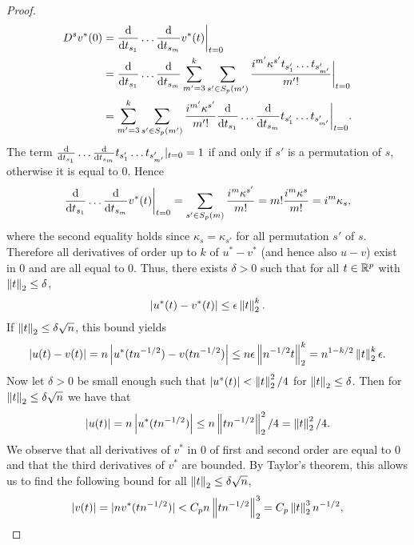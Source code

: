 \begin{proof}
    \begin{align*}
        D^s v^*(0)
        &= \frac{\text{d}}{\text{d} t_{s_1}}\ldots\frac{\text{d}}{\text{d} t_{s_m}} v^*(t) \bigg|_{t=0}\\
        &= \frac{\text{d}}{\text{d} t_{s_1}}\ldots\frac{\text{d}}{\text{d} t_{s_m}} \sum_{m'=3}^k \sum_{s' \in S_p(m')} \frac{i^{m'}\kappa^{s'}t_{s'_1}\ldots t_{s'_{m'}}}{m'!} \bigg|_{t=0} \\
        &= \sum_{m'=3}^k \sum_{s' \in S_p(m')} \frac{i^{m'}\kappa^{s'}}{m'!} \frac{\text{d}}{\text{d} t_{s_1}}\ldots\frac{\text{d}}{\text{d} t_{s_m}}t_{s'_1}\ldots t_{s'_{m'}} \bigg|_{t=0}.
    \end{align*}
    The term $\frac{\text{d}}{\text{d} t_{s_1}}\ldots\frac{\text{d}}{\text{d} t_{s_m}}t_{s'_1}\ldots t_{s'_{m'}} |_{t=0} = 1$ if and only if $s'$ is a permutation of $s$, otherwise it is equal to 0. Hence
    \begin{equation*}
        \frac{\text{d}}{\text{d} t_{s_1}}\ldots\frac{\text{d}}{\text{d} t_{s_m}} v^*(t) \bigg|_{t=0} 
        = \sum_{s' \in S_p(m)} \frac{i^m\kappa^{s'}}{m!}
        = m! \frac{i^m\kappa^{s}}{m!}
        = i^m\kappa_s,
    \end{equation*}
    where the second equality holds since $\kappa_s = \kappa_{s'}$ for all permutation $s'$ of $s$. Therefore all derivatives of order up to $k$ of $u^* - v^*$ (and hence also $u - v$) exist in 0 and are all equal to 0. Thus, there exists $\delta > 0$ such that for all $t \in {\mathbb{R}^p}$ with $\left\lVert t\right\rVert_2 \leq \delta$,
    \begin{equation*}
        \left|u^*(t) - v^*(t)\right| \leq \epsilon\left\lVert t\right\rVert_2^k.
    \end{equation*}
    If $\left\lVert t\right\rVert_2 \leq \delta \sqrt{n}$, this bound yields
    \begin{equation*}
        \left|u(t) - v(t)\right| = n\left|u^*(t n^{-1/2}) - v(t n^{-1/2})\right| \leq n\epsilon\left\lVert n^{-1/2}t\right\rVert_2^k = n^{1-k/2}\left\lVert t\right\rVert_2^k\epsilon.
    \end{equation*}
    Now let $\delta > 0$ be small enough such that $\left|u^*(t)\right| < \left\lVert t\right\rVert_2^2/4$ for $\left\lVert t\right\rVert_2 \leq \delta$. Then for $\left\lVert t\right\rVert_2 \leq \delta\sqrt{n}$ we have that
    \begin{equation*}
        \left|u(t)\right| = n\left|u^*(t n^{-1/2})\right| \leq n \left\lVert t n^{-1/2}\right\rVert_2^2/4 = \left\lVert t\right\rVert_2^2/4.
    \end{equation*}
    We observe that all derivatives of $v^*$ in 0 of first and second order are equal to 0 and that the third derivatives of $v^*$ are bounded. By Taylor's theorem, this allows us to find the following bound for all $\left\lVert t\right\rVert_2 \leq \delta \sqrt{n}$,
    \begin{equation*}
        |v(t)| = |nv^*(t n^{-1/2})| < C_p n \norm{t n^{-1/2}}_2^3 = C_p \norm{t}_2^3 n^{-1/2},

\end{equation*}
\end{proof}
